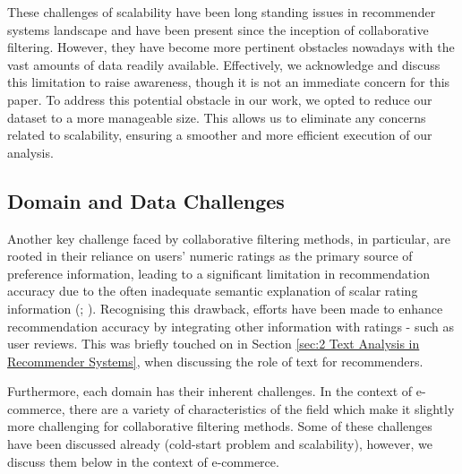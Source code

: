 These challenges of scalability have been long standing issues in recommender systems landscape and have been present since the inception of collaborative filtering. However, they have become more pertinent obstacles nowadays with the vast amounts of data readily available. Effectively, we acknowledge and discuss this limitation to raise awareness, though it is not an immediate concern for this paper. To address this potential obstacle in our work, we opted to reduce our dataset to a more manageable size. This allows us to eliminate any concerns related to scalability, ensuring a smoother and more efficient execution of our analysis.

\subsection{Domain and Data Challenges}
\label{subsec: Domain and Data Challenges}

Another key challenge faced by collaborative filtering methods, in particular, are rooted in their reliance on users' numeric ratings as the primary source of preference information, leading to a significant limitation in recommendation accuracy due to the often inadequate semantic explanation of scalar rating information (\cite{leino2007case}; \cite{shoja2019customer}). Recognising this drawback, efforts have been made to enhance recommendation accuracy by integrating other information with ratings - such as user reviews. This was briefly touched on in Section \ref{sec:2 Text Analysis in Recommender Systems}, when discussing the role of text for recommenders.

Furthermore, each domain has their inherent  challenges. In the context of e-commerce, there are a variety of characteristics of the field which make it slightly more challenging for collaborative filtering methods. Some of these challenges have been discussed already (cold-start problem and scalability), however, we discuss them below in the context of e-commerce.

